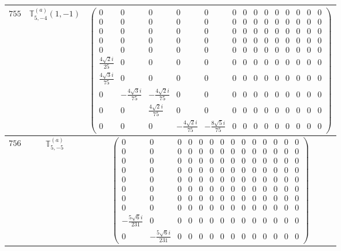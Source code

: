 \documentclass[fleqn,8pt,landscape]{jsarticle}
\begin{document}
\begin{center}
\begin{longtable}{ccc}
$ 755 $ & $ \mathbb{T}_{5,-4}^{(a)}(1,-1) $ & $ \begin{pmatrix} 0 & 0 & 0 & 0 & 0 & 0 & 0 & 0 & 0 & 0 & 0 & 0 & 0 & 0 \\ 0 & 0 & 0 & 0 & 0 & 0 & 0 & 0 & 0 & 0 & 0 & 0 & 0 & 0 \\ 0 & 0 & 0 & 0 & 0 & 0 & 0 & 0 & 0 & 0 & 0 & 0 & 0 & 0 \\ 0 & 0 & 0 & 0 & 0 & 0 & 0 & 0 & 0 & 0 & 0 & 0 & 0 & 0 \\ 0 & 0 & 0 & 0 & 0 & 0 & 0 & 0 & 0 & 0 & 0 & 0 & 0 & 0 \\ \frac{4 \sqrt{2} i}{25} & 0 & 0 & 0 & 0 & 0 & 0 & 0 & 0 & 0 & 0 & 0 & 0 & 0 \\ \frac{4 \sqrt{3} i}{75} & 0 & 0 & 0 & 0 & 0 & 0 & 0 & 0 & 0 & 0 & 0 & 0 & 0 \\ 0 & - \frac{4 \sqrt{3} i}{75} & - \frac{4 \sqrt{2} i}{75} & 0 & 0 & 0 & 0 & 0 & 0 & 0 & 0 & 0 & 0 & 0 \\ 0 & 0 & \frac{4 \sqrt{2} i}{75} & 0 & 0 & 0 & 0 & 0 & 0 & 0 & 0 & 0 & 0 & 0 \\ 0 & 0 & 0 & - \frac{4 \sqrt{2} i}{75} & - \frac{8 \sqrt{5} i}{75} & 0 & 0 & 0 & 0 & 0 & 0 & 0 & 0 & 0 \end{pmatrix} $ \\ \hline
$ 756 $ & $ \mathbb{T}_{5,-5}^{(a)} $ & $ \begin{pmatrix} 0 & 0 & 0 & 0 & 0 & 0 & 0 & 0 & 0 & 0 & 0 & 0 & 0 & 0 \\ 0 & 0 & 0 & 0 & 0 & 0 & 0 & 0 & 0 & 0 & 0 & 0 & 0 & 0 \\ 0 & 0 & 0 & 0 & 0 & 0 & 0 & 0 & 0 & 0 & 0 & 0 & 0 & 0 \\ 0 & 0 & 0 & 0 & 0 & 0 & 0 & 0 & 0 & 0 & 0 & 0 & 0 & 0 \\ 0 & 0 & 0 & 0 & 0 & 0 & 0 & 0 & 0 & 0 & 0 & 0 & 0 & 0 \\ 0 & 0 & 0 & 0 & 0 & 0 & 0 & 0 & 0 & 0 & 0 & 0 & 0 & 0 \\ 0 & 0 & 0 & 0 & 0 & 0 & 0 & 0 & 0 & 0 & 0 & 0 & 0 & 0 \\ 0 & 0 & 0 & 0 & 0 & 0 & 0 & 0 & 0 & 0 & 0 & 0 & 0 & 0 \\ - \frac{5 \sqrt{6} i}{231} & 0 & 0 & 0 & 0 & 0 & 0 & 0 & 0 & 0 & 0 & 0 & 0 & 0 \\ 0 & - \frac{5 \sqrt{6} i}{231} & 0 & 0 & 0 & 0 & 0 & 0 & 0 & 0 & 0 & 0 & 0 & 0 \end{pmatrix} $ \\ \hline

\end{longtable}
\end{center}
\end{document}
